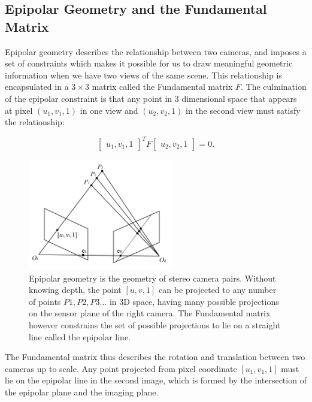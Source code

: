 \documentclass[openany]{book}
\begin{document}
\subsection{Epipolar Geometry and the Fundamental Matrix}

Epipolar geometry describes the relationship between two cameras, and imposes a set of constraints which makes it possible for us to draw meaningful geometric information when we have two views of the same scene. This relationship is encapsulated in a $3 \times 3$ matrix called the Fundamental matrix $F$. The culmination of the epipolar constraint is that any point in 3 dimensional space that appears at pixel $(u_1, v_1, 1)$ in one view and $(u_2, v_2, 1)$ in the second view must satisfy the relationship:

\begin{equation}
    \begin{bmatrix}
        u_1, v_1, 1
    \end{bmatrix}^T
    F
    \begin{bmatrix}
        u_2, v_2, 1
    \end{bmatrix}
    = 0.
\end{equation}

\begin{figure}
    \centering
    \includegraphics[width=2.5in]{images/epipolarplane.png}
    \caption{Epipolar geometry is the geometry of stereo camera pairs. Without knowing depth, the point $[u,v,1]$ can be projected to any number of points $P1, P2, P3... $ in 3D space, having many possible projections on the sensor plane of the right camera. The Fundamental matrix however constrains the set of possible projections to lie on a straight line called the epipolar line.}
    \label{epipolarplane}
\end{figure}

The Fundamental matrix thus describes the rotation and translation between two cameras up to scale. Any point projected from pixel coordinate $[u_1, v_1, 1]$ must lie on the epipolar line in the second image, which is formed by the intersection of the epipolar plane and the imaging plane. 
\end{document}
